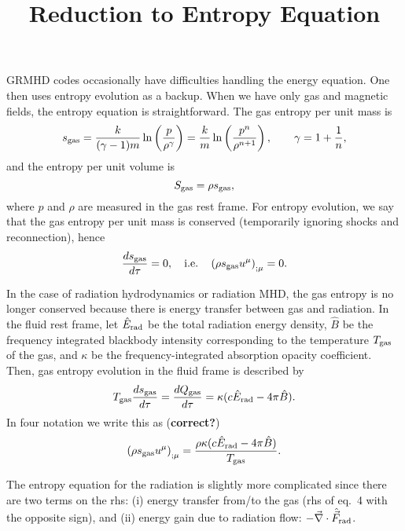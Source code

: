 \documentclass[12pt,preprint]{aastex}
\begin{document}
                                              

\def\bE{\bar{E}}
\def\bR{\bar{R}}
\def\bu{\bar{u}}

\title{Reduction to Entropy Equation}

GRMHD codes occasionally have difficulties handling the energy
equation. One then uses entropy evolution as a backup. When we have
only gas and magnetic fields, the entropy equation is
straightforward. The gas entropy per unit mass is
\begin{equation}
s_{\rm gas} = \frac{k}{(\gamma-1)m}\ln \left(\frac{p}{\rho^\gamma}\right)
=\frac{k}{m}\ln \left(\frac{p^n}{\rho^{n+1}}\right),
\qquad \gamma = 1+\frac{1}{n},
\end{equation}
and the entropy per unit volume is
\begin{equation}
S_{\rm gas} = \rho s_{\rm gas},
\end{equation}
where $p$ and $\rho$ are measured in the gas rest frame. For entropy
evolution, we say that the gas entropy per unit mass is conserved
(temporarily ignoring shocks and reconnection), hence
\begin{equation}
\frac{ds_{\rm gas}}{d\tau} = 0, \quad {\rm i.e.}\quad
\left(\rho s_{\rm gas} u^\mu \right)_{;\mu} = 0.
\end{equation}

In the case of radiation hydrodynamics or radiation MHD, the gas
entropy is no longer conserved because there is energy transfer
between gas and radiation. In the fluid rest frame, let $\hat{E}_{\rm
  rad}$ be the total radiation energy density, $\hat{B}$ be the
frequency integrated blackbody intensity corresponding to the
temperature $T_{\rm gas}$ of the gas, and $\kappa$ be the frequency-integrated
absorption opacity coefficient. Then, gas entropy evolution in the
fluid frame is described by
\begin{equation}
T_{\rm gas}\frac{ds_{\rm gas}}{d\tau} = \frac{dQ_{\rm gas}}{d\tau} = \kappa
(c\hat{E}_{\rm rad}-4\pi\hat{B}).
\end{equation}
In four notation we write this as ({\bf correct?})
\begin{equation}
\left(\rho s_{\rm gas} u^\mu \right)_{;\mu} = 
\frac{\rho\kappa (c\hat{E}_{\rm rad}-4\pi\hat{B})}{T_{\rm gas}}.
\end{equation}

The entropy equation for the radiation is slightly more complicated
since there are two terms on the rhs: (i) energy transfer from/to the
gas (rhs of eq.~4 with the opposite sign), and (ii) energy gain due to
radiation flow: $-\vec{\nabla}\cdot\hat{\vec{F}}_{\rm rad}$.
\end{document}
